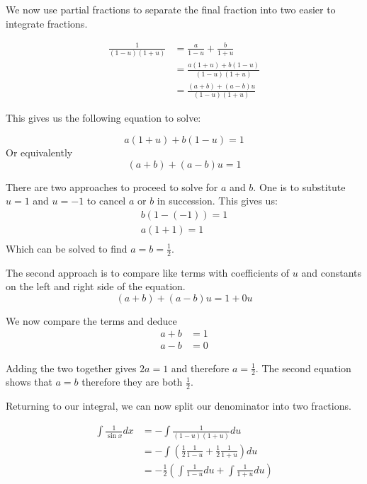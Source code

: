 \begin{solution}
    We now use partial fractions to separate the final fraction into two easier to integrate fractions.

    \begin{align*}
        \frac{1}{(1-u)(1+u)} &= \frac{a}{1-u} + \frac{b}{1+u} \tag{set up partial fractions}\\
         &= \frac{a(1+u) + b(1-u)}{(1-u)(1+u)} \tag{add the fractions}\\
         &= \frac{(a + b) + (a-b)u}{(1-u)(1+u)} \tag{collecting terms}
    \end{align*}

    This gives us the following equation to solve:

    \[ a(1+u) + b(1-u) = 1\]
    Or equivalently 
    \[ (a + b) + (a-b)u = 1\]
    
    There are two approaches to proceed to solve for $a$ and $b$. One is to substitute $u=1$ and $u=-1$ to cancel $a$ or $b$ in succession.
    This gives us:
    \begin{align*}
        b(1- (-1)) = 1 \tag{$u = -1$}\\
        a(1+1)= 1 \tag{$u = 1$}\\
    \end{align*}
    Which can be solved to find $a = b = \frac{1}{2}$.

    The second approach is to compare like terms with coefficients of $u$ and constants on the left and right side of the equation.
    \[ (a + b) + (a-b)u = 1 + 0u\]

    We now compare the terms and deduce 
    \begin{align*}
        a + b &= 1 \\
        a - b &= 0
    \end{align*}

    Adding the two together gives $2a = 1$ and therefore $a = \frac{1}{2}$. The second equation shows that $a = b$ therefore they are both $\frac{1}{2}$.

    Returning to our integral, we can now split our denominator into two fractions.
    
        \begin{align*}
        \int \frac{1}{\sin x} dx &= -\int \frac{1}{(1-u)(1+u)}du \tag{where we left off}\\
         &= - \int\left( \frac{1}{2}\frac{1}{1-u} + \frac{1}{2}\frac{1}{1+u} \right)du \tag{substituting the partial fraction coefficients}\\
         &= - \frac{1}{2}\left(\int \frac{1}{1-u}du + \int \frac{1}{1+u}du \right) \tag{factorising}\\
    \end{align*}


\end{solution}
